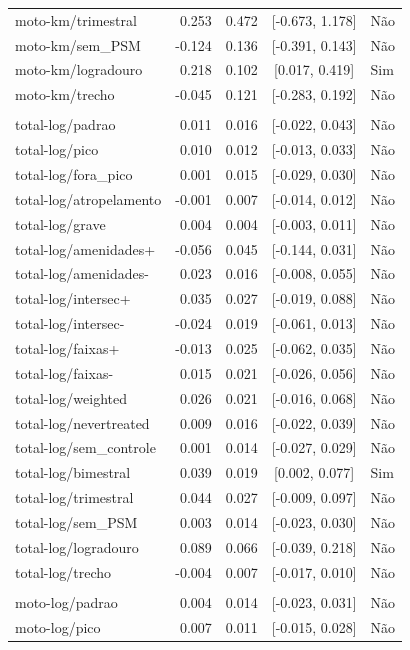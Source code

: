 \begin{longtable}{lrrcl}
moto-km/trimestral & 0.253 & 0.472 & {}[-0.673, 1.178] & Não\\
moto-km/sem\_PSM & -0.124 & 0.136 & {}[-0.391, 0.143] & Não\\
moto-km/logradouro & 0.218 & 0.102 & {}[0.017, 0.419] & Sim\\
moto-km/trecho & -0.045 & 0.121 & {}[-0.283, 0.192] & Não\\
 &  &  &  & \\
total-log/padrao & 0.011 & 0.016 & {}[-0.022, 0.043] & Não\\
total-log/pico & 0.010 & 0.012 & {}[-0.013, 0.033] & Não\\
total-log/fora\_pico & 0.001 & 0.015 & {}[-0.029, 0.030] & Não\\
total-log/atropelamento & -0.001 & 0.007 & {}[-0.014, 0.012] & Não\\
total-log/grave & 0.004 & 0.004 & {}[-0.003, 0.011] & Não\\
total-log/amenidades+ & -0.056 & 0.045 & {}[-0.144, 0.031] & Não\\
total-log/amenidades- & 0.023 & 0.016 & {}[-0.008, 0.055] & Não\\
total-log/intersec+ & 0.035 & 0.027 & {}[-0.019, 0.088] & Não\\
total-log/intersec- & -0.024 & 0.019 & {}[-0.061, 0.013] & Não\\
total-log/faixas+ & -0.013 & 0.025 & {}[-0.062, 0.035] & Não\\
total-log/faixas- & 0.015 & 0.021 & {}[-0.026, 0.056] & Não\\
total-log/weighted & 0.026 & 0.021 & {}[-0.016, 0.068] & Não\\
total-log/nevertreated & 0.009 & 0.016 & {}[-0.022, 0.039] & Não\\
total-log/sem\_controle & 0.001 & 0.014 & {}[-0.027, 0.029] & Não\\
total-log/bimestral & 0.039 & 0.019 & {}[0.002, 0.077] & Sim\\
total-log/trimestral & 0.044 & 0.027 & {}[-0.009, 0.097] & Não\\
total-log/sem\_PSM & 0.003 & 0.014 & {}[-0.023, 0.030] & Não\\
total-log/logradouro & 0.089 & 0.066 & {}[-0.039, 0.218] & Não\\
total-log/trecho & -0.004 & 0.007 & {}[-0.017, 0.010] & Não\\
 &  &  &  & \\
moto-log/padrao & 0.004 & 0.014 & {}[-0.023, 0.031] & Não\\
moto-log/pico & 0.007 & 0.011 & {}[-0.015, 0.028] & Não\\

\end{longtable}
